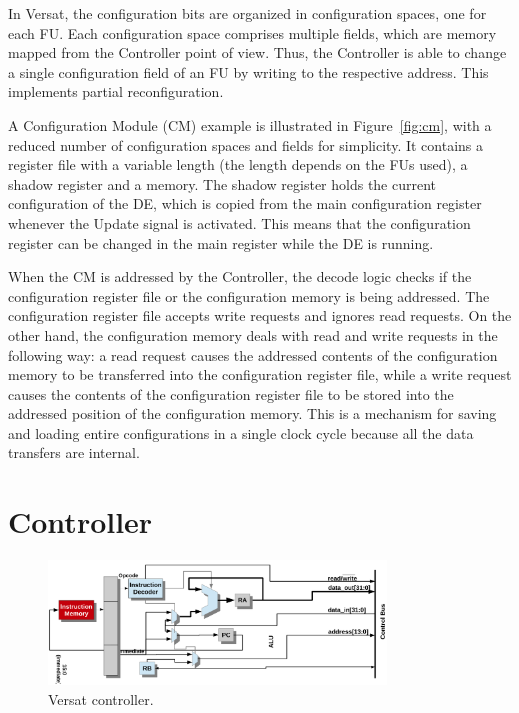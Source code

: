 In Versat, the configuration bits are organized in configuration spaces, one for
each FU. Each configuration space comprises multiple fields, which are memory
mapped from the Controller point of view. Thus, the Controller is able to change
a single configuration field of an FU by writing to the respective address. This
implements partial reconfiguration.

A Configuration Module (CM) example is illustrated in Figure~\ref{fig:cm}, with
a reduced number of configuration spaces and fields for simplicity. It contains
a register file with a variable length (the length depends on the FUs used), a
shadow register and a memory. The shadow register holds the current
configuration of the DE, which is copied from the main configuration register
whenever the Update signal is activated. This means that the configuration
register can be changed in the main register while the DE is running.

When the CM is addressed by the Controller, the decode logic checks if the
configuration register file or the configuration memory is being addressed. The
configuration register file accepts write requests and ignores read requests. On
the other hand, the configuration memory deals with read and write requests in
the following way: a read request causes the addressed contents of the
configuration memory to be transferred into the configuration register file,
while a write request causes the contents of the configuration register file to
be stored into the addressed position of the configuration memory. This is a
mechanism for saving and loading entire configurations in a single clock cycle
because all the data transfers are internal.

\section{Controller}
\label{section:controller}

\begin{figure}[!htb]
	\centering
	\includegraphics[width=0.8\textwidth]{Figures/controller.png}
	\caption{Versat controller.}
	\label{fig:controller}
\end{figure}

